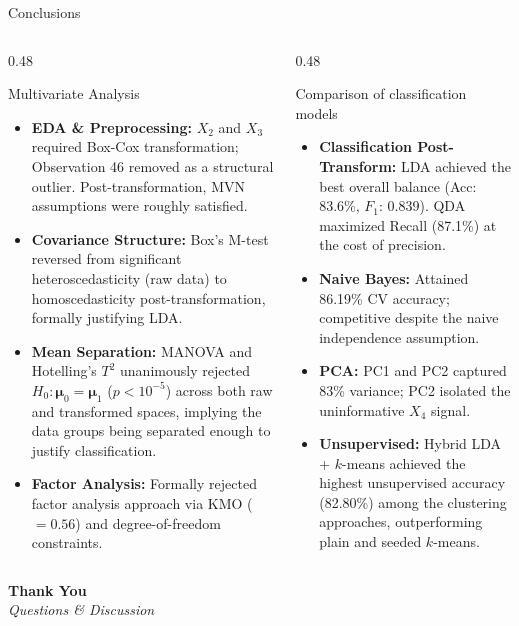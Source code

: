 \documentclass[8pt, aspectratio=169]{beamer}
\begin{document}
\begin{frame}{Conclusions}
    \begin{columns}[T]
        \begin{column}{0.48\textwidth}
            \begin{block}{Multivariate Analysis}
                \small
                \begin{itemize}
                    \item \textbf{EDA \& Preprocessing:} $X_2$ and $X_3$ required Box-Cox transformation; Observation 46 removed as a structural outlier. Post-transformation, MVN assumptions were roughly satisfied.
                    \item \textbf{Covariance Structure:} Box's M-test reversed from significant heteroscedasticity (raw data) to homoscedasticity post-transformation, formally justifying LDA.
                    \item \textbf{Mean Separation:} MANOVA and Hotelling's $T^2$ unanimously rejected $H_0: \boldsymbol{\mu}_0 = \boldsymbol{\mu}_1$ ($p < 10^{-5}$) across both raw and transformed spaces, implying the data groups being separated enough to justify classification.
               
               \item \textbf{Factor Analysis:} Formally rejected factor analysis approach via KMO ($= 0.56$) and degree-of-freedom constraints.
                \end{itemize}
            \end{block}
        \end{column}
        \begin{column}{0.48\textwidth}
            \begin{block}{Comparison of classification models}
                \small
                \begin{itemize}
                    \item \textbf{Classification Post-Transform:} LDA achieved the best overall balance (Acc: 83.6\%, $F_1$: 0.839). QDA maximized Recall (87.1\%) at the cost of precision.
                    \item \textbf{Naive Bayes:} Attained 86.19\% CV accuracy; competitive despite the naive independence assumption.
                    \item \textbf{PCA:} PC1 and PC2 captured 83\% variance; PC2 isolated the uninformative $X_4$ signal.
                   
                    \item \textbf{Unsupervised:} Hybrid LDA + $k$-means achieved the highest unsupervised accuracy (82.80\%) among the clustering approaches, outperforming plain and seeded $k$-means.
                \end{itemize}
            \end{block}
        \end{column}
    \end{columns}
\end{frame}

\begin{frame}[plain]
    \vfill
    \begin{center}
        \Huge \textbf{Thank You} \\[1cm]
        \Large \textit{Questions \& Discussion}
    \end{center}
    \vfill
\end{frame}
\end{document}
